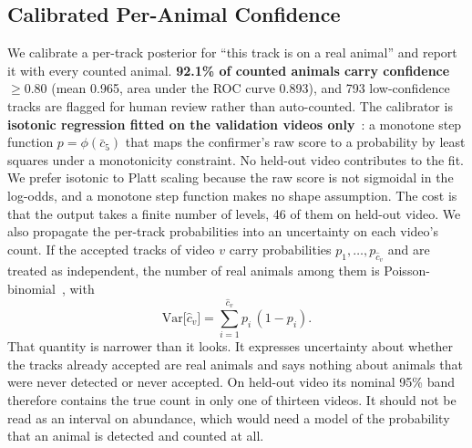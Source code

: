 \subsection{Calibrated Per-Animal Confidence}
\label{sec:calibration}

We calibrate a per-track
posterior for ``this track is on a real animal'' and report it with every counted animal.
\textbf{92.1\% of counted animals carry confidence $\ge0.80$} (mean 0.965, area under the
ROC curve 0.893), and 793 low-confidence tracks are flagged for human review rather than
auto-counted. The calibrator is \textbf{isotonic regression fitted on the validation videos
only}~\cite{zadrozny2002transforming}: a monotone step function $p=\phi(\bar{c}_5)$ that
maps the confirmer's raw score to a probability by least squares under a monotonicity
constraint. No held-out video contributes to the fit. We prefer isotonic to Platt scaling
because the raw score is not sigmoidal in the log-odds, and a monotone step function makes
no shape assumption. The cost is that the output takes a finite number of levels, 46 of
them on held-out video. We also propagate the per-track probabilities into an uncertainty
on each video's count. If the accepted tracks of video $v$ carry probabilities
$p_1,\dots,p_{\hat{c}_v}$ and are treated as independent, the number of real animals among
them is Poisson-binomial~\cite{hong2013poisson}, with
\begin{equation}
\mathrm{Var}\bigl[\hat{c}_v\bigr]=\sum_{i=1}^{\hat{c}_v} p_i\,(1-p_i).
\label{eq:pb}
\end{equation}
That quantity is narrower than it looks. It expresses uncertainty about whether the tracks
already accepted are real animals and says nothing about animals that were never detected
or never accepted. On held-out video its nominal 95\% band therefore contains the true
count in only one of thirteen videos. It should not be read as an interval on abundance,
which would need a model of the probability that an animal is detected and counted at all.

